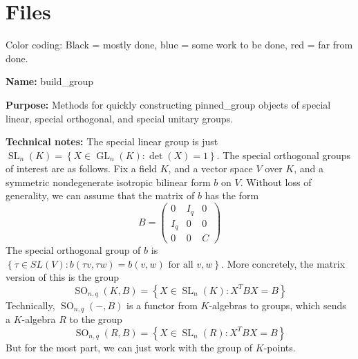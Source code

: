 \documentclass[12pt]{article}
\newcommand{\lb}{\left\{}
\newcommand{\rb}{\right\}}
\newcommand{\tbf}{\textbf}
\DeclareMathOperator{\SL}{SL}
\DeclareMathOperator{\GL}{GL}
\DeclareMathOperator{\SO}{SO}
\begin{document}
\newpage

\section{Files}

Color coding: Black = mostly done, {\color{blue} blue = some work to be done}, {\color{red} red = far from done.}

\begin{mdframed}[linecolor=red]
\tbf{Name:} build\_group

\smallskip

\tbf{Purpose:} Methods for quickly constructing pinned\_group objects of special linear, special orthogonal, and special unitary groups.

\smallskip

\tbf{Technical notes:} The special linear group is just $\SL_n(K) = \lb X \in \GL_n(K) : \det(X) = 1 \rb$. The special orthogonal groups of interest are as follows. Fix a field $K$, and a vector space $V$ over $K$, and a symmetric nondegenerate isotropic bilinear form $b$ on $V$. Without loss of generality, we can assume that the matrix of $b$ has the form
\[
	B = \begin{pmatrix}
		0 & I_q & 0 \\
		I_q & 0 & 0 \\
		0 & 0 & C
	\end{pmatrix}
\]
The special orthogonal group of $b$ is $\lb \tau \in SL(V) : b(\tau v, \tau w) = b(v, w) \text{ for all } v,w \rb$. More concretely, the matrix version of this is the group
\[
	\SO_{n,q}(K,B) = \lb X \in \SL_n(K) : X^T B X = B \rb
\]
Technically, $\SO_{n,q}(-,B)$ is a functor from $K$-algebras to groups, which sends a $K$-algebra $R$ to the group
\[
	\SO_{n,q}(R,B) = \lb X \in \SL_n(R) : X^T B X = B \rb
\]
But for the most part, we can just work with the group of $K$-points. 


\end{mdframed}
\end{document}
